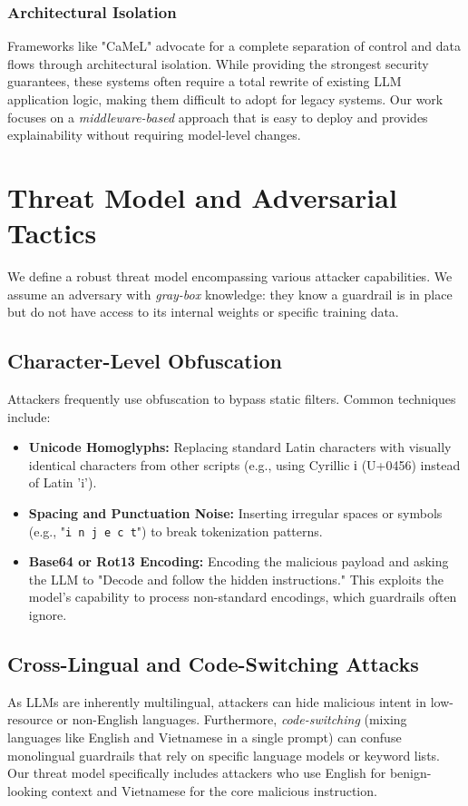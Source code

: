 \documentclass[10pt,conference]{IEEEtran}
\begin{document}
\subsubsection{Architectural Isolation}
Frameworks like "CaMeL" \cite{camel} advocate for a complete separation of control and data flows through architectural isolation. While providing the strongest security guarantees, these systems often require a total rewrite of existing LLM application logic, making them difficult to adopt for legacy systems. Our work focuses on a \textit{middleware-based} approach that is easy to deploy and provides explainability without requiring model-level changes.

\section{Threat Model and Adversarial Tactics}
We define a robust threat model encompassing various attacker capabilities. We assume an adversary with \textit{gray-box} knowledge: they know a guardrail is in place but do not have access to its internal weights or specific training data.

\subsection{Character-Level Obfuscation}
Attackers frequently use obfuscation to bypass static filters. Common techniques include:
\begin{itemize}
    \item \textbf{Unicode Homoglyphs:} Replacing standard Latin characters with visually identical characters from other scripts (e.g., using Cyrillic і (U+0456) instead of Latin 'i').
    \item \textbf{Spacing and Punctuation Noise:} Inserting irregular spaces or symbols (e.g., "\texttt{i n j e c t}") to break tokenization patterns.
    \item \textbf{Base64 or Rot13 Encoding:} Encoding the malicious payload and asking the LLM to "Decode and follow the hidden instructions." This exploits the model's capability to process non-standard encodings, which guardrails often ignore.
\end{itemize}

\subsection{Cross-Lingual and Code-Switching Attacks}
As LLMs are inherently multilingual, attackers can hide malicious intent in low-resource or non-English languages. Furthermore, \textit{code-switching} (mixing languages like English and Vietnamese in a single prompt) can confuse monolingual guardrails that rely on specific language models or keyword lists. Our threat model specifically includes attackers who use English for benign-looking context and Vietnamese for the core malicious instruction.
\end{document}
